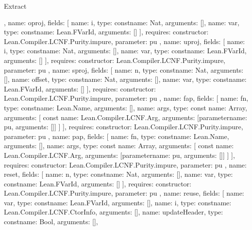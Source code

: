 \begin{lexlean}{Extract}
\begin{toolingmodule}
{{{        },
        {
          name: oproj,
          fields: [
            {name: i, type: const{name: Nat, arguments: []}},
            {name: var, type: const{name: Lean.FVarId, arguments: []}}
          ],
          requires: {constructor: Lean.Compiler.LCNF.Purity.impure, parameter: pu}
        },
        {
          name: uproj,
          fields: [
            {name: i, type: const{name: Nat, arguments: []}},
            {name: var, type: const{name: Lean.FVarId, arguments: []}}
          ],
          requires: {constructor: Lean.Compiler.LCNF.Purity.impure, parameter: pu}
        },
        {
          name: sproj,
          fields: [
            {name: n, type: const{name: Nat, arguments: []}},
            {name: offset, type: const{name: Nat, arguments: []}},
            {name: var, type: const{name: Lean.FVarId, arguments: []}}
          ],
          requires: {constructor: Lean.Compiler.LCNF.Purity.impure, parameter: pu}
        },
        {
          name: fap,
          fields: [
            {name: fn, type: const{name: Lean.Name, arguments: []}},
            {
              name: args,
              type: const{
                name: Array,
                arguments: [
                  const{
                    name: Lean.Compiler.LCNF.Arg,
                    arguments: [parameter{name: pu, arguments: []}]
                  }
                ]
              }
            }
          ],
          requires: {constructor: Lean.Compiler.LCNF.Purity.impure, parameter: pu}
        },
        {
          name: pap,
          fields: [
            {name: fn, type: const{name: Lean.Name, arguments: []}},
            {
              name: args,
              type: const{
                name: Array,
                arguments: [
                  const{
                    name: Lean.Compiler.LCNF.Arg,
                    arguments: [parameter{name: pu, arguments: []}]
                  }
                ]
              }
            }
          ],
          requires: {constructor: Lean.Compiler.LCNF.Purity.impure, parameter: pu}
        },
        {
          name: reset,
          fields: [
            {name: n, type: const{name: Nat, arguments: []}},
            {name: var, type: const{name: Lean.FVarId, arguments: []}}
          ],
          requires: {constructor: Lean.Compiler.LCNF.Purity.impure, parameter: pu}
        },
        {
          name: reuse,
          fields: [
            {name: var, type: const{name: Lean.FVarId, arguments: []}},
            {name: i, type: const{name: Lean.Compiler.LCNF.CtorInfo, arguments: []}},
            {name: updateHeader, type: const{name: Bool, arguments: []}},
}}}
\end{toolingmodule}
\end{lexlean}
